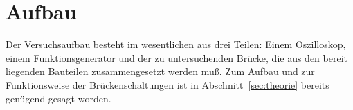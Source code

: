 
\section{Aufbau}

Der Versuchsaufbau besteht im wesentlichen aus drei Teilen: Einem
Oszilloskop, einem Funktionsgenerator und der zu untersuchenden
Brücke, die aus den bereit liegenden Bauteilen zusammengesetzt werden
muß. Zum Aufbau und zur Funktionsweise der Brückenschaltungen ist in
Abschnitt~\ref{sec:theorie} bereits genügend gesagt worden.

